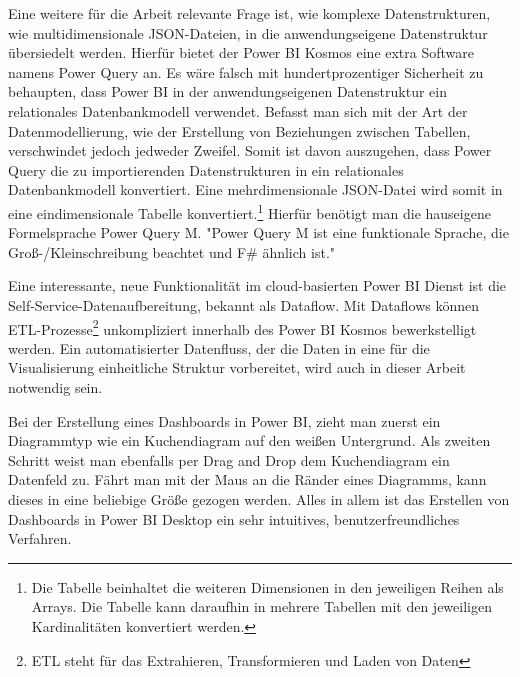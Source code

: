 Eine weitere für die Arbeit relevante Frage ist, wie komplexe Datenstrukturen, wie multidimensionale JSON-Dateien,
in die anwendungseigene Datenstruktur übersiedelt werden. Hierfür bietet der Power BI Kosmos eine extra Software
namens Power Query an. Es wäre falsch mit hundertprozentiger Sicherheit zu behaupten, dass Power BI in der
anwendungseigenen Datenstruktur ein relationales Datenbankmodell verwendet. Befasst man sich mit der Art
der Datenmodellierung, wie der Erstellung von Beziehungen zwischen Tabellen, verschwindet jedoch jedweder Zweifel.\cite[S. 319]{ProPowerBIDesktop}
Somit ist davon auszugehen, dass Power Query die zu importierenden Datenstrukturen in ein relationales Datenbankmodell
konvertiert. Eine mehrdimensionale JSON-Datei wird somit in eine eindimensionale Tabelle
konvertiert.\footnote{Die Tabelle beinhaltet die weiteren Dimensionen in den jeweiligen Reihen als Arrays.
Die Tabelle kann daraufhin in mehrere Tabellen mit den jeweiligen Kardinalitäten konvertiert werden.}
Hierfür benötigt man die hauseigene Formelsprache Power Query M. "Power Query M ist eine funktionale Sprache,
die Groß-/Kleinschreibung beachtet und F\# ähnlich ist."\cite{MicrosoftDocsPowerQueryFormelsprache}

Eine interessante, neue Funktionalität im cloud-basierten Power BI Dienst ist die Self-Service-Datenaufbereitung,
bekannt als Dataflow. Mit Dataflows können ETL-Prozesse\footnote{ETL steht für das Extrahieren, Transformieren und Laden von Daten}
unkompliziert innerhalb des Power BI Kosmos bewerkstelligt werden. Ein automatisierter Datenfluss,
der die Daten in eine für die Visualisierung einheitliche Struktur vorbereitet, wird auch in dieser
Arbeit notwendig sein.

Bei der Erstellung eines Dashboards in Power BI, zieht man zuerst ein Diagrammtyp wie ein Kuchendiagram
auf den weißen Untergrund. Als zweiten Schritt weist man ebenfalls per Drag and Drop dem Kuchendiagram ein
Datenfeld zu. Fährt man mit der Maus an die Ränder eines Diagramms, kann dieses in eine beliebige Größe
gezogen werden. Alles in allem ist das Erstellen von Dashboards in Power BI Desktop ein sehr intuitives,
benutzerfreundliches Verfahren.

